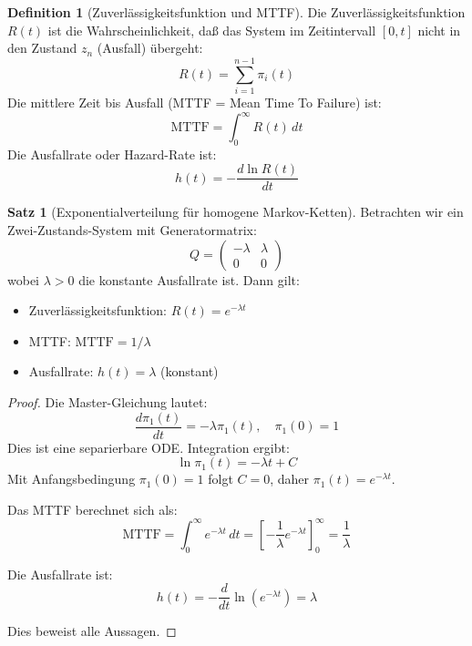 \documentclass[a4paper,11pt]{article}
\theoremstyle{definition}
\newtheorem{definition}{Definition}
\newtheorem{satz}{Satz}
\newenvironment{beweis}{\begin{proof}}{\end{proof}}
\begin{document}
\begin{definition}[Zuverlässigkeitsfunktion und MTTF]
    Die Zuverlässigkeitsfunktion $R(t)$ ist die Wahrscheinlichkeit, daß das System im 
    Zeitintervall $[0, t]$ nicht in den Zustand $z_n$ (Ausfall) übergeht:
    \[
        R(t) = \sum_{i=1}^{n-1} \pi_i(t)
    \]
    Die mittlere Zeit bis Ausfall (MTTF = Mean Time To Failure) ist:
    \[
        \text{MTTF} = \int_0^{\infty} R(t) \, dt
    \]
    Die Ausfallrate oder Hazard-Rate ist:
    \[
        h(t) = -\frac{d \ln R(t)}{dt}
    \]
\end{definition}

\begin{satz}[Exponentialverteilung für homogene Markov-Ketten]
    \label{satz:exponential_detailed}
    Betrachten wir ein Zwei-Zustands-System mit Generatormatrix:
    \[
        Q = \begin{pmatrix} -\lambda & \lambda \\ 0 & 0 \end{pmatrix}
    \]
    wobei $\lambda > 0$ die konstante Ausfallrate ist. Dann gilt:
    \begin{itemize}
        \item Zuverlässigkeitsfunktion: $R(t) = e^{-\lambda t}$
        \item MTTF: $\text{MTTF} = 1/\lambda$
        \item Ausfallrate: $h(t) = \lambda$ (konstant)
    \end{itemize}

    \begin{beweis}
        Die Master-Gleichung lautet:
        \[
            \frac{d\pi_1(t)}{dt} = -\lambda \pi_1(t), \quad \pi_1(0) = 1
        \]
        Dies ist eine separierbare ODE. Integration ergibt:
        \[
            \ln \pi_1(t) = -\lambda t + C
        \]
        Mit Anfangsbedingung $\pi_1(0) = 1$ folgt $C = 0$, daher $\pi_1(t) = e^{-\lambda t}$.

        Das MTTF berechnet sich als:
        \[
            \text{MTTF} = \int_0^{\infty} e^{-\lambda t} \, dt = \left[-\frac{1}{\lambda} e^{-\lambda t}\right]_0^{\infty} 
            = \frac{1}{\lambda}
        \]

        Die Ausfallrate ist:
        \[
            h(t) = -\frac{d}{dt} \ln(e^{-\lambda t}) = \lambda
        \]

        Dies beweist alle Aussagen.
    \end{beweis}
\end{satz}
\end{document}
